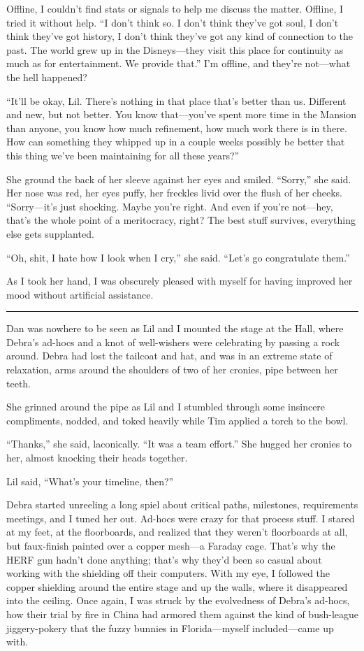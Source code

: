 Offline, I couldn't find stats or signals to help me discuss the
matter. Offline, I tried it without help. “I don't think so. I
don't think they've got soul, I don't think they've got history, I
don't think they've got any kind of connection to the past. The
world grew up in the Disneys—they visit this place for continuity
as much as for entertainment. We provide that.” I'm offline, and
they're not—what the hell happened?

“It'll be okay, Lil. There's nothing in that place that's better
than us. Different and new, but not better. You know that—you've
spent more time in the Mansion than anyone, you know how much
refinement, how much work there is in there. How can something they
whipped up in a couple weeks possibly be better that this thing
we've been maintaining for all these years?”

She ground the back of her sleeve against her eyes and smiled.
“Sorry,” she said. Her nose was red, her eyes puffy, her freckles
livid over the flush of her cheeks. “Sorry—it's just shocking.
Maybe you're right. And even if you're not—hey, that's the whole
point of a meritocracy, right? The best stuff survives, everything
else gets supplanted.

“Oh, shit, I hate how I look when I cry,” she said. “Let's go
congratulate them.”

As I took her hand, I was obscurely pleased with myself for having
improved her mood without artificial assistance.

\begin{center}\rule{3in}{0.4pt}\end{center}

Dan was nowhere to be seen as Lil and I mounted the stage at the
Hall, where Debra's ad-hocs and a knot of well-wishers were
celebrating by passing a rock around. Debra had lost the tailcoat
and hat, and was in an extreme state of relaxation, arms around the
shoulders of two of her cronies, pipe between her teeth.

She grinned around the pipe as Lil and I stumbled through some
insincere compliments, nodded, and toked heavily while Tim applied
a torch to the bowl.

“Thanks,” she said, laconically. “It was a team effort.” She hugged
her cronies to her, almost knocking their heads together.

Lil said, “What's your timeline, then?”

Debra started unreeling a long spiel about critical paths,
milestones, requirements meetings, and I tuned her out. Ad-hocs
were crazy for that process stuff. I stared at my feet, at the
floorboards, and realized that they weren't floorboards at all, but
faux-finish painted over a copper mesh—a Faraday cage. That's why
the HERF gun hadn't done anything; that's why they'd been so casual
about working with the shielding off their computers. With my eye,
I followed the copper shielding around the entire stage and up the
walls, where it disappeared into the ceiling. Once again, I was
struck by the evolvedness of Debra's ad-hocs, how their trial by
fire in China had armored them against the kind of bush-league
jiggery-pokery that the fuzzy bunnies in Florida—myself
included—came up with.


